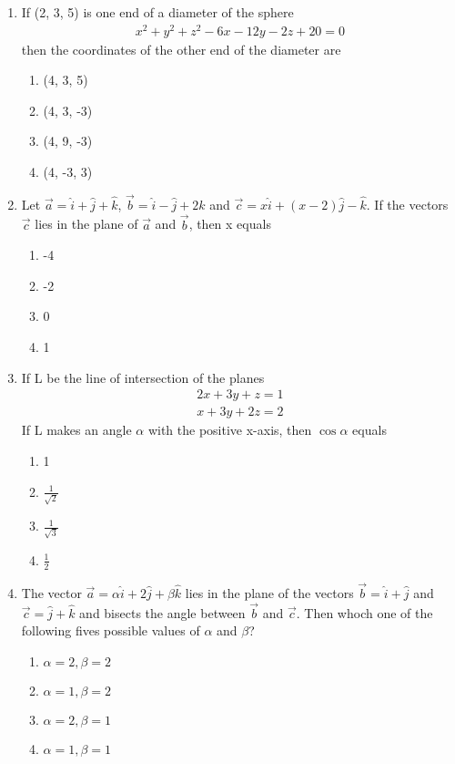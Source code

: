 \begin{enumerate}[label=\arabic*.,ref=\thesubsection.\theenumi]
\item If (2, 3, 5) is one end of a diameter of the sphere
\begin{align}
x^2 + y^2 + z^2 - 6x - 12y - 2z + 20 = 0
\end{align}
then the coordinates of the other end of the diameter are
\begin{enumerate}
\item (4, 3, 5)
\item (4, 3, -3)
\item (4, 9, -3)
\item (4, -3, 3)
\end{enumerate}

\item Let $\overrightarrow{a} = \hat{i} + \hat{j} + \hat{k}$, $\overrightarrow{b} = \hat{i} - \hat{j} + 2\hat{k}$ and 
$\overrightarrow{c} = x\hat{i} + (x - 2)\hat{j} - \hat{k}$. If the vectors $\overrightarrow{c}$ lies in the plane of 
$\overrightarrow{a}$ and $\overrightarrow{b}$, then x equals
\begin{enumerate}
\item -4
\item -2
\item 0
\item 1
\end{enumerate}

\item If L be the line of intersection of the planes 
\begin{align*}
2x + 3y + z = 1
\end{align*}
\begin{align*}
x + 3y + 2z = 2
\end{align*}
If L makes an angle $\alpha$ with the positive x-axis, then $\cos\alpha$ equals
\begin{enumerate}
\item 1
\item $\frac{1}{\sqrt{2}}$
\item $\frac{1}{\sqrt{3}}$
\item $\frac{1}{2}$
\end{enumerate}

\item The vector $\overrightarrow{a} = \alpha\hat{i} + 2\hat{j} + \beta\hat{k}$ lies in the plane of the vectors $\overrightarrow{b} = \hat{i} + \hat{j}$ and $\overrightarrow{c} = \hat{j} + \hat{k}$ and bisects the angle between $\overrightarrow{b}$ and $\overrightarrow{c}$. Then whoch one of the following fives possible values of $\alpha$ and $\beta$?
\begin{enumerate}
\item $\alpha = 2, \beta = 2$
\item $\alpha = 1, \beta = 2$
\item $\alpha = 2, \beta = 1$
\item $\alpha = 1, \beta = 1$
\end{enumerate}


\end{enumerate}
